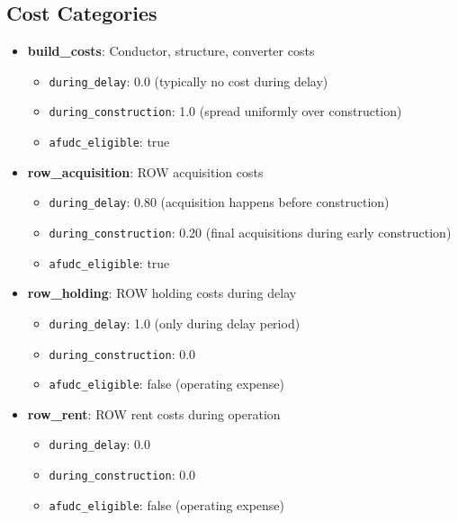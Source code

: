 \documentclass[ctcc_full_documentation.tex]{subfiles}
\begin{document}
\subsection{Cost Categories}

\begin{itemize}
    \item \textbf{build\_costs}: Conductor, structure, converter costs
    \begin{itemize}
        \item \texttt{during\_delay}: 0.0 (typically no cost during delay)
        \item \texttt{during\_construction}: 1.0 (spread uniformly over construction)
        \item \texttt{afudc\_eligible}: true
    \end{itemize}
    
    \item \textbf{row\_acquisition}: ROW acquisition costs
    \begin{itemize}
        \item \texttt{during\_delay}: 0.80 (acquisition happens before construction)
        \item \texttt{during\_construction}: 0.20 (final acquisitions during early construction)
        \item \texttt{afudc\_eligible}: true
    \end{itemize}
    
    \item \textbf{row\_holding}: ROW holding costs during delay
    \begin{itemize}
        \item \texttt{during\_delay}: 1.0 (only during delay period)
        \item \texttt{during\_construction}: 0.0
        \item \texttt{afudc\_eligible}: false (operating expense)
    \end{itemize}
    
    \item \textbf{row\_rent}: ROW rent costs during operation
    \begin{itemize}
        \item \texttt{during\_delay}: 0.0
        \item \texttt{during\_construction}: 0.0
        \item \texttt{afudc\_eligible}: false (operating expense)
    \end{itemize}
    

\end{itemize}
\end{document}
